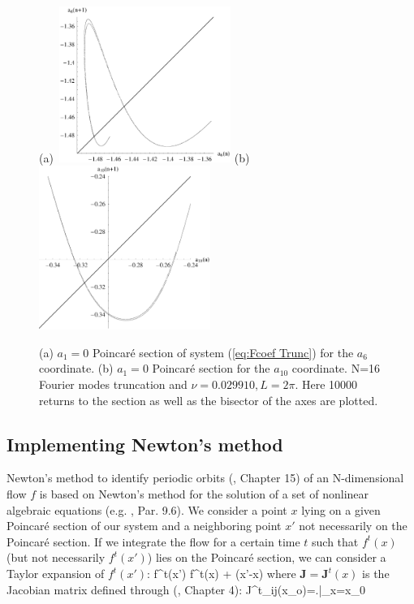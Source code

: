 \documentclass[pre,preprint,groupedaddress,showpacs,showkeys]{revtex4}
\begin{document}
%
 \begin{figure}[t!]
    (a)~\includegraphics[width=2.2in]{figs/poin6-bi.eps}%
    \hspace{0.2cm}%
    (b)~\includegraphics[width=2.2in]{figs/poin10-bi.eps}
    \caption{(a) $a_1=0$ Poincar\'e section of system (\ref{eq:Fcoef Trunc}) for the $a_6$ coordinate.
             (b) $a_1=0$ Poincar\'e section for the $a_{10}$ coordinate.
             N=16 Fourier modes truncation and $\nu=0.029910, L=2\pi$. Here 10000 returns to the section as well as
             the bisector of the axes are plotted.
             }
    \label{fig:guess}
 \end{figure}



 \subsection{Implementing Newton's method}

  Newton's method to identify periodic orbits (\cite{DasBuch}, Chapter 15) of an N-dimensional flow $f$
  is based on Newton's method for the solution of a set of nonlinear algebraic equations
  (e.g. \cite{Press:96}, Par. 9.6). We consider a point $x$ lying on a given Poincar\'e section of our system
  and a neighboring point $x'$ not necessarily on the Poincar\'e section. If we integrate
  the flow for a certain time $t$ such that $f^t(x)$ (but not necessarily $f^t(x')$) lies on the Poincar\'e
  section, we can consider a Taylor expansion of $f^t(x')$:
  \beq
    f^t(x') \simeq f^t(x) + (x'-x)
    \label{eq:Taylor of Flow}
  \eeq
  where $\mathbf{J}=\mathbf{J}^t(x)$ is the Jacobian matrix defined through (\cite{DasBuch}, Chapter 4):
  \beq
   J^t_{ij}(x_o)=\left.\right|_{x=x_0}
  \eeq
\end{document}
